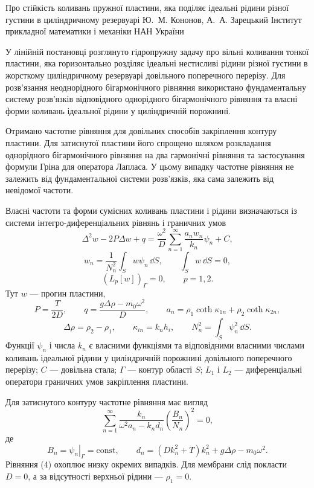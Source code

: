 \ReportHeading
  {Про стійкість коливань пружної пластини, яка поділяє ідеальні рідини різної густини в циліндричному резервуарі}
  {Ю.~М. Кононов, А.~А. Зарецький}
  {Інститут прикладної математики і механіки НАН України}
  {}

У лінійній постановці розглянуто гідропружну задачу про вільні коливання тонкої пластини, яка горизонтально розділяє ідеальні нестисливі рідини різної густини в жорсткому циліндричному резервуарі довільного поперечного перерізу. Для розв’язання неоднорідного бігармонічного рівняння використано фундаментальну систему розв’язків відповідного однорідного бігармонічного рівняння та власні форми коливань ідеальної рідини у циліндричній порожнині.

Отримано частотне рівняння для довільних способів закріплення контуру пластини. Для затиснутої пластини його спрощено шляхом розкладання однорідного бігармонічного рівняння на два гармонічні рівняння та застосування формули Гріна для оператора Лапласа. У цьому випадку частотне рівняння не залежить від фундаментальної системи розв’язків, яка сама залежить від невідомої частоти.

Власні частоти та форми сумісних коливань пластини і рідини визначаються із системи інтегро-диференціальних рівнянь і граничних умов
\begin{equation}
 \Delta^2 w-2P\Delta w+q
 =\frac{\omega^2}{D}\sum_{n=1}^{\infty}\frac{a_n w_n}{k_n}\psi_n+C,
\end{equation}
\begin{equation}
 w_n=\frac{1}{N_n^2}\int_S w\psi_n\,\dd S,
 \qquad
 \int_S w\,\dd S=0,
\end{equation}
\begin{equation}
 \left(L_p[w]\right)_{\Gamma}=0,
 \qquad p=1,2.
\end{equation}
Тут $w$ --- прогин пластини,
\[
 P=\frac{T}{2D},\qquad
 q=\frac{g\Delta\rho-m_0\omega^2}{D},\qquad
 a_n=\rho_1\coth\kappa_{1n}+\rho_2\coth\kappa_{2n},
\]
\[
 \Delta\rho=\rho_2-\rho_1,\qquad
 \kappa_{in}=k_n h_i,\qquad
 N_n^2=\int_S\psi_n^2\,\dd S.
\]
Функції $\psi_n$ і числа $k_n$ є власними функціями та відповідними власними числами коливань ідеальної рідини у циліндричній порожнині довільного поперечного перерізу; $C$ --- довільна стала; $\Gamma$ --- контур області $S$; $L_1$ і $L_2$ --- диференціальні оператори граничних умов закріплення пластини.

Для затиснутого контуру частотне рівняння має вигляд
\begin{equation}
 \sum_{n=1}^{\infty}
 \frac{k_n}{\omega^2 a_n-k_n d_n}
 \left(\frac{B_n}{N_n}\right)^2=0,
\end{equation}
де
\[
 B_n=\left.\psi_n\right|_{\Gamma}=\mathrm{const},
 \qquad
 d_n=(Dk_n^2+T)k_n^2+g\Delta\rho-m_0\omega^2.
\]
Рівняння (4) охоплює низку окремих випадків. Для мембрани слід покласти $D=0$, а за відсутності верхньої рідини --- $\rho_1=0$.

